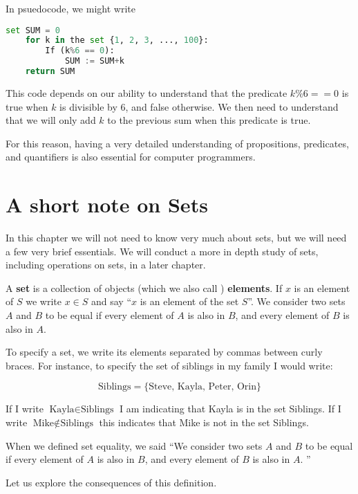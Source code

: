 In psuedocode, we might write

\begin{lstlisting}[language=Python]
	set SUM = 0
	for k in the set {1, 2, 3, ..., 100}:
		If (k%6 == 0):
			SUM := SUM+k 
	return SUM
\end{lstlisting}

This code depends on our ability to understand that the predicate $k\%6 == 0$ is true when $k$ is divisible by $6$, and false otherwise.  We then need to understand that we will only add $k$ to the previous sum when this predicate is true.

For this reason, having a very detailed understanding of propositions, predicates, and quantifiers is also essential for computer programmers.

\section{A short note on Sets}

In this chapter we will not need to know very much about sets, but we will need a few very brief essentials.  We will conduct a more in depth study of sets, including operations on sets, in a later chapter.

\begin{definition}
		A \textbf{set} is a collection of objects (which we also call ) \textbf{elements}.  If $x$ is an element of $S$ we write $x \in S$ and say ``$x$ is an element of the set $S$''.  We consider two sets $A$ and $B$ to be equal if every element of $A$ is also in $B$, and every element of $B$ is also in $A$. 
	\end{definition}

To specify a set, we write its elements separated by commas between curly braces.  For instance, to specify the set of siblings in my family I would write:

\[
\textrm{Siblings} = \{\textrm{Steve, Kayla, Peter, Orin}\}
\]

If I write $\textrm{Kayla} \in \textrm{Siblings}$ I am indicating that Kayla is in the set Siblings.  If I write $\textrm{Mike} \notin \textrm{Siblings}$ this indicates that Mike is not in the set Siblings.

When we defined set equality, we said ``We consider two sets $A$ and $B$ to be equal if every element of $A$ is also in $B$, and every element of $B$ is also in $A$. ''

Let us explore the consequences of this definition.

